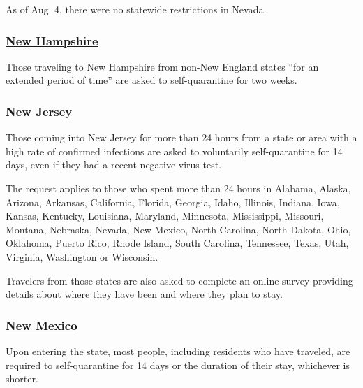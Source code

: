 As of Aug. 4, there were no statewide restrictions in Nevada.

\hypertarget{new-hampshire}{%
\subsubsection{\texorpdfstring{\href{https://www.covidguidance.nh.gov/out-state-visitors}{New
Hampshire}}{New Hampshire}}\label{new-hampshire}}

Those traveling to New Hampshire from non-New England states ``for an
extended period of time'' are asked to self-quarantine for two weeks.

\hypertarget{new-jersey}{%
\subsubsection{\texorpdfstring{\href{https://covid19.nj.gov/faqs/nj-information/general-public/which-states-are-on-the-travel-advisory-list-are-there-travel-restrictions-to-or-from-new-jersey}{New
Jersey}}{New Jersey}}\label{new-jersey}}

Those coming into New Jersey for more than 24 hours from a state or area
with a high rate of confirmed infections are asked to voluntarily
self-quarantine for 14 days, even if they had a recent negative virus
test.

The request applies to those who spent more than 24 hours in Alabama,
Alaska, Arizona, Arkansas, California, Florida, Georgia, Idaho,
Illinois, Indiana, Iowa, Kansas, Kentucky, Louisiana, Maryland,
Minnesota, Mississippi, Missouri, Montana, Nebraska, Nevada, New Mexico,
North Carolina, North Dakota, Ohio, Oklahoma, Puerto Rico, Rhode Island,
South Carolina, Tennessee, Texas, Utah, Virginia, Washington or
Wisconsin.

Travelers from those states are also asked to complete an online survey
providing details about where they have been and where they plan to
stay.

\hypertarget{new-mexico}{%
\subsubsection{\texorpdfstring{\href{https://www.newmexico.org/covid-19-traveler-information/}{New
Mexico}}{New Mexico}}\label{new-mexico}}

Upon entering the state, most people, including residents who have
traveled, are required to self-quarantine for 14 days or the duration of
their stay, whichever is shorter.

